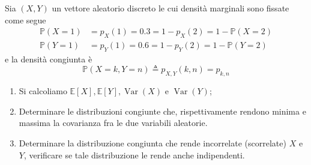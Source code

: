 \documentclass[a4paper]{article}
\begin{document}
\begin{snippetexercise}{}
    Sia \((X,Y)\) un vettore aleatorio discreto le cui densità marginali sono fissate come segue
    \begin{align*}
        \mathbb P(X = 1) &= p_X(1) = 0.3 = 1- p_X(2) = 1-\mathbb P(X=2) \\
        \mathbb P(Y = 1) &= p_Y(1) = 0.6 = 1- p_Y(2) = 1-\mathbb P(Y=2)
    \end{align*}
    e la densità congiunta è
    \[
        \mathbb P(X=k, Y =n) \triangleq p_{X,Y}(k,n) = p_{k,n}
    \]
    \begin{enumerate}
        \item Si calcoliamo \(\mathbb E[X], \mathbb E[Y], \operatorname{Var}(X)\) e \(\operatorname{Var}(Y)\);
        \item Determinare le distribuzioni congiunte che, rispettivamente rendono minima e massima la covarianza fra le due variabili aleatorie.
        \item Determinare la distribuzione congiunta che rende incorrelate (scorrelate) \(X\) e \(Y\),
            verificare se tale distribuzione le rende anche indipendenti.
    \end{enumerate}
\end{snippetexercise}
\end{document}
